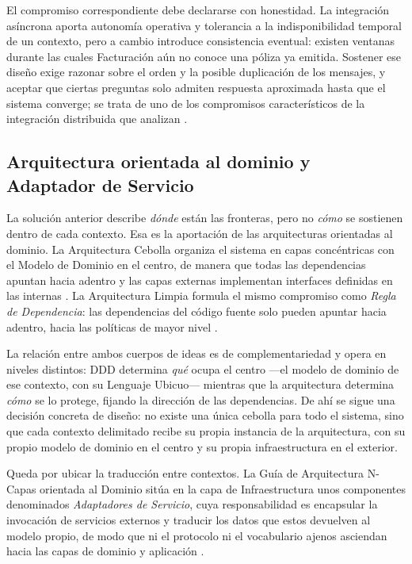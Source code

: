 El compromiso correspondiente debe declararse con honestidad. La integración asíncrona aporta
autonomía operativa y tolerancia a la indisponibilidad temporal de un contexto, pero a cambio
introduce consistencia eventual: existen ventanas durante las cuales Facturación aún no conoce una
póliza ya emitida. Sostener ese diseño exige razonar sobre el orden y la posible duplicación de los
mensajes, y aceptar que ciertas preguntas solo admiten respuesta aproximada hasta que el sistema
converge; se trata de uno de los compromisos característicos de la integración distribuida que
analizan \textcite{richardsford2020}.

\subsection*{Arquitectura orientada al dominio y Adaptador de Servicio}

La solución anterior describe \emph{dónde} están las fronteras, pero no \emph{cómo} se sostienen
dentro de cada contexto. Esa es la aportación de las arquitecturas orientadas al dominio.
La Arquitectura Cebolla organiza el sistema en capas concéntricas con el Modelo de Dominio en el
centro, de manera que todas las dependencias apuntan hacia adentro y las capas externas implementan
interfaces definidas en las internas \parencite{palermo2008}. La Arquitectura Limpia formula el
mismo compromiso como \emph{Regla de Dependencia}: las dependencias del código fuente solo pueden
apuntar hacia adentro, hacia las políticas de mayor nivel \parencite{martin2017}.

La relación entre ambos cuerpos de ideas es de complementariedad y opera en niveles distintos: DDD
determina \emph{qué} ocupa el centro ---el modelo de dominio de ese contexto, con su Lenguaje
Ubicuo--- mientras que la arquitectura determina \emph{cómo} se lo protege, fijando la dirección de
las dependencias. De ahí se sigue una decisión concreta de diseño: no existe una única cebolla para
todo el sistema, sino que cada contexto delimitado recibe su propia instancia de la arquitectura,
con su propio modelo de dominio en el centro y su propia infraestructura en el exterior.

Queda por ubicar la traducción entre contextos. La Guía de Arquitectura N-Capas orientada al Dominio
sitúa en la capa de Infraestructura unos componentes denominados \emph{Adaptadores de Servicio}, cuya
responsabilidad es encapsular la invocación de servicios externos y traducir los datos que estos
devuelven al modelo propio, de modo que ni el protocolo ni el vocabulario ajenos asciendan hacia las
capas de dominio y aplicación \parencite{delatorre2010}.

